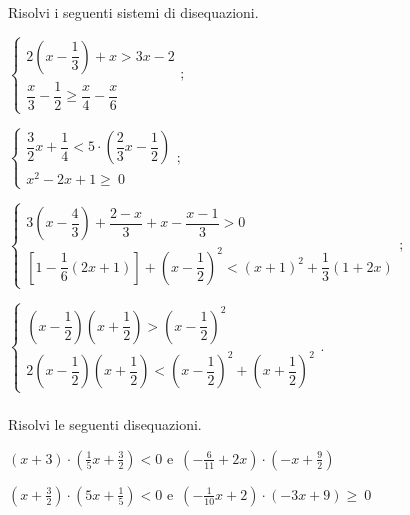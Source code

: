 \begin{esercizio}[\Ast]
 \label{ese:21.41}
 Risolvi i seguenti sistemi di disequazioni.

 \begin{enumeratea}
 \item {\longarray \(\left\{\begin{array}{l}
  2\left(x-\dfrac{1}{3}\right)+x>3x-2\\
        \dfrac{x}{3}-\dfrac{1}{2}\ge \dfrac{x}{4}-\dfrac{x}{6}
   \end{array}\right.;\)}
\item \(\left\{\begin{array}{l}
    \dfrac{3}{2}x+\dfrac{1}{4}<5\cdot\left(\dfrac{2}{3}x-\dfrac{1}{2}\right)\\
    x^2-2x+1\ge~0
   \end{array}\right.;\)
\item {\longarray \(\left\{\begin{array}{l}
  3\left(x-\dfrac{4}{3}\right)+\dfrac{2-x}{3}+x-\dfrac{x-1}{3}>0\\
        \left[1-\dfrac{1}{6}(2x+1)\right]+\left(x-\dfrac{1}{2}\right)^{2}<(x+1)^{2}+\dfrac{1}{3}(1+2x)
   \end{array}\right.;\)}
\item {\longarray \(\left\{\begin{array}{l}
        \left(x-\dfrac{1}{2}\right)\left(x+\dfrac{1}{2}\right)>\left(x-\dfrac{1}{2}\right)^{2}\\
  2\left(x-\dfrac{1}{2}\right)\left(x+\dfrac{1}{2}\right)<\left(x-\dfrac{1}{2}\right)^{2}+\left(x+\dfrac{1}{2}\right)^{2}
   \end{array}\right..\)}
 \end{enumeratea}
\end{esercizio}

\subsubsection*{}

\begin{esercizio}
 \label{ese:21.42}
 Risolvi le seguenti disequazioni.

\begin{enumeratea}
\item \((x+3)\cdot \left(\frac{1}{5}x+\frac{3}{2}\right)<0\) e~\(\left(-{\frac{6}{11}}+2x\right)\cdot\left(-x+\frac{9}{2}\right)\)
\item \(\left(x+\frac{3}{2}\right)\cdot \left(5x+\frac{1}{5}\right)<0\) e~\(\left(-{\frac{1}{10}}x+2\right)\cdot \left(-3x+9\right)\ge~0\)
\end{enumeratea}

\end{esercizio}

